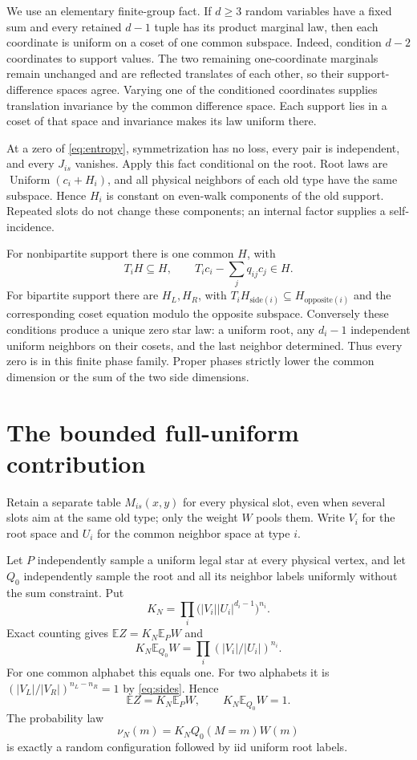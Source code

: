 \documentclass[11pt]{article}
\newcommand{\E}{\mathbb E}
\begin{document}
We use an elementary finite-group fact. If $d\ge3$ random variables have a fixed sum and every retained $d-1$ tuple has its product marginal law, then each coordinate is uniform on a coset of one common subspace. Indeed, condition $d-2$ coordinates to support values. The two remaining one-coordinate marginals remain unchanged and are reflected translates of each other, so their support-difference spaces agree. Varying one of the conditioned coordinates supplies translation invariance by the common difference space. Each support lies in a coset of that space and invariance makes its law uniform there.

At a zero of \eqref{eq:entropy}, symmetrization has no loss, every pair is independent, and every $J_{is}$ vanishes. Apply this fact conditional on the root. Root laws are $\operatorname{Uniform}(c_i+H_i)$, and all physical neighbors of each old type have the same subspace. Hence $H_i$ is constant on even-walk components of the old support. Repeated slots do not change these components; an internal factor supplies a self-incidence.

For nonbipartite support there is one common $H$, with
\begin{equation}\label{eq:phase}
 T_iH\subseteq H,\qquad T_ic_i-\sum_jq_{ij}c_j\in H.
\end{equation}
For bipartite support there are $H_L,H_R$, with $T_iH_{\mathrm{side}(i)}\subseteq H_{\mathrm{opposite}(i)}$ and the corresponding coset equation modulo the opposite subspace. Conversely these conditions produce a unique zero star law: a uniform root, any $d_i-1$ independent uniform neighbors on their cosets, and the last neighbor determined. Thus every zero is in this finite phase family. Proper phases strictly lower the common dimension or the sum of the two side dimensions.

\section{The bounded full-uniform contribution}
Retain a separate table $M_{is}(x,y)$ for every physical slot, even when several slots aim at the same old type; only the weight $W$ pools them. Write $V_i$ for the root space and $U_i$ for the common neighbor space at type $i$.

Let $P$ independently sample a uniform legal star at every physical vertex, and let $Q_0$ independently sample the root and all its neighbor labels uniformly without the sum constraint. Put
\[
 K_N=\prod_i\bigl(|V_i||U_i|^{d_i-1}\bigr)^{n_i}.
\]
Exact counting gives $\E Z=K_N\E_PW$ and
\[
 K_N\E_{Q_0}W=\prod_i(|V_i|/|U_i|)^{n_i}.
\]
For one common alphabet this equals one. For two alphabets it is $(|V_L|/|V_R|)^{n_L-n_R}=1$ by \eqref{eq:sides}. Hence
\begin{equation}\label{eq:normalizers}
 \E Z=K_N\E_PW,
 \qquad K_N\E_{Q_0}W=1.
\end{equation}
The probability law
\[
 \nu_N(m)=K_N Q_0(M=m)W(m)
\]
is exactly a random configuration followed by iid uniform root labels.
\end{document}
